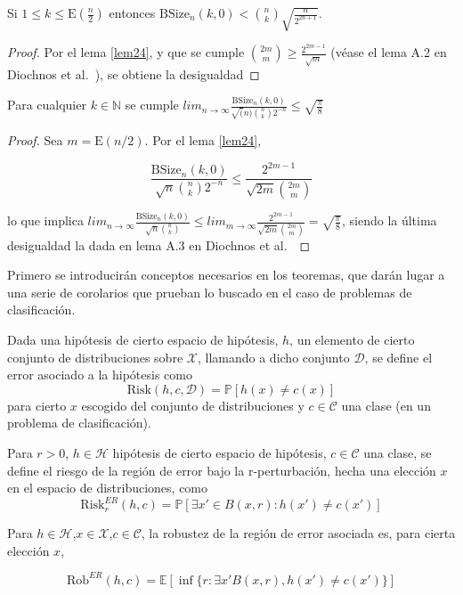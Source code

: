 \begin{corolario} \label{coro21}
Si $1 \leq k \leq \text{E}\left(\frac{n}{2}\right)$ entonces $\text{BSize}_n(k, 0) < \binom{n}{k} \sqrt{\frac{n}{2^{2n+1}}}$.

\end{corolario}

\begin{proof}
Por el lema \ref{lem24}, y que se cumple $\binom{2m}{m} \geq \frac{2^{2m-1}}{\sqrt{m}}$ (véase el lema A.2 en Diochnos et al.~\cite{LimitsAdvers}), se obtiene la desigualdad
\end{proof}

\begin{corolario} \label{coro22}
Para cualquier $k \in \mathbb{N}$ se cumple $lim_{n \to \infty} \frac{\text{BSize}_n(k,0)}{\sqrt(n)\binom{n}{k}2^{-n}} \leq \sqrt{\frac{\pi}{8}}$
\end{corolario}
\begin{proof}
Sea $m=\text{E}(n/2)$. Por el lema \ref{lem24}, 

$$\frac{\text{BSize}_n(k,0)}{\sqrt{n}\binom{n}{k}2^{-n}} \leq \frac{2^{2m-1}}{\sqrt{2m}\binom{2m}{m}}$$

lo que implica $lim_{n \to \infty} \frac{\text{BSize}_n(k,0)}{\sqrt{n}\binom{n}{k}} \leq lim_{m \to \infty} \frac{2^{2m-1}}{\sqrt{2m}\binom{2m}{m}}=\sqrt{\frac{\pi}{8}}$, siendo la última desigualdad la dada en lema A.3 en Diochnos et al.~\cite{LimitsAdvers}
\end{proof}

Primero se introducirán conceptos necesarios en los teoremas, que darán lugar a una serie de corolarios que prueban lo buscado en el caso de problemas de clasificación.

\begin{definicion} \label{def22}
Dada una hipótesis de cierto espacio de hipótesis, $h$, un elemento de cierto conjunto de distribuciones sobre $\mathcal{X}$, llamando a dicho conjunto $\mathcal{D}$, se define el error asociado a la hipótesis como 
$$\text{Risk}(h,c,\mathcal{D})=\mathbb{P}[h(x)\neq c(x)]$$ para cierto $x$ escogido del conjunto de distribuciones y $c \in \mathcal{C}$ una clase (en un problema de clasificación).

\end{definicion}
\begin{definicion} \label{def23}
Para $r>0$,  $h \in \mathcal{H}$ hipótesis de cierto espacio de hipótesis, $c \in \mathcal{C}$ una clase, se define el riesgo de la región de error bajo la r-perturbación, hecha una elección $x$ en el espacio de distribuciones, como
$$\text{Risk}_r^{ER}(h,c)=\mathbb{P}[\exists x' \in B(x,r) : h(x') \neq c(x')]$$
\end{definicion}
\begin{definicion}
Para $h \in \mathcal{H}$,$x \in \mathcal{X}$,$c \in \mathcal{C}$, la robustez de la región de error asociada es, para cierta elección $x$,

$$\text{Rob}^{ER}(h,c)=\mathbb{E}[\inf\{r:\exists x' B(x,r), h(x')\neq c(x')\}]$$
\end{definicion}

